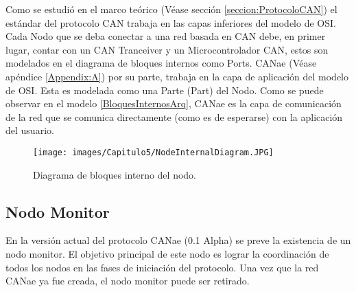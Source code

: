 Como se estudió en el marco teórico (Véase sección \ref{seccion:ProtocoloCAN})
el estándar del protocolo CAN \citep{can-ciaWEB} trabaja en las capas
inferiores del modelo de OSI. Cada Nodo que se deba conectar a una red basada
en CAN debe, en primer lugar, contar con un CAN Tranceiver y un
Microcontrolador CAN, estos son modelados en el diagrama de bloques
internos como Ports. CANae (Véase apéndice \ref{Appendix:A}) por su parte,
trabaja en la capa de aplicación del modelo de OSI. Esta es modelada como
una Parte (Part) del Nodo. Como se puede observar en el modelo
\ref{BloquesInternosArq}, CANae es la capa de comunicación de la red
que se comunica directamente (como es de esperarse) con la aplicación
del usuario. 

\begin{figure}[h!]
 \centering
 \texttt{[image: images/Capitulo5/NodeInternalDiagram.JPG]}
 \caption{Diagrama de bloques interno del nodo.}
\label{fig:BloquesInternosArq}
\end{figure}

\subsection{Nodo Monitor}
En la versión actual del protocolo CANae (0.1 Alpha) se preve la existencia de un
nodo monitor. El objetivo principal de este nodo es lograr la coordinación 
de todos los nodos en las fases de iniciación del protocolo. Una vez que la red
CANae ya fue creada, el nodo monitor  puede ser retirado.
